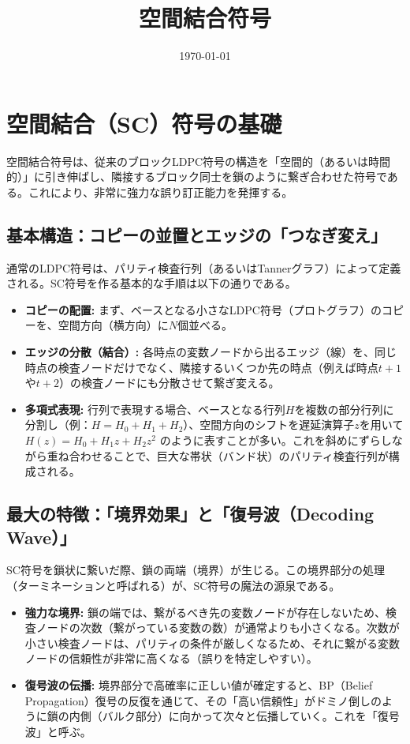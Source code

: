 \documentclass[a4paper,11pt,dvipdfmx]{jsarticle}
\theoremstyle{definition}
\begin{document}
\title{空間結合符号}
\author{}
\date{\today}
\maketitle
\tableofcontents

\section{空間結合（SC）符号の基礎}

空間結合符号は、従来のブロックLDPC符号の構造を「空間的（あるいは時間的）」に引き伸ばし、隣接するブロック同士を鎖のように繋ぎ合わせた符号である。これにより、非常に強力な誤り訂正能力を発揮する。

\subsection{基本構造：コピーの並置とエッジの「つなぎ変え」}
通常のLDPC符号は、パリティ検査行列（あるいはTannerグラフ）によって定義される。SC符号を作る基本的な手順は以下の通りである。

\begin{itemize}
    \item \textbf{コピーの配置:} まず、ベースとなる小さなLDPC符号（プロトグラフ）のコピーを、空間方向（横方向）に$N$個並べる。
    \item \textbf{エッジの分散（結合）:} 各時点の変数ノードから出るエッジ（線）を、同じ時点の検査ノードだけでなく、隣接するいくつか先の時点（例えば時点$t+1$や$t+2$）の検査ノードにも分散させて繋ぎ変える。
    \item \textbf{多項式表現:} 行列で表現する場合、ベースとなる行列$H$を複数の部分行列に分割し（例：$H = H_0 + H_1 + H_2$）、空間方向のシフトを遅延演算子$z$を用いて $H(z) = H_0 + H_1 z + H_2 z^2$ のように表すことが多い。これを斜めにずらしながら重ね合わせることで、巨大な帯状（バンド状）のパリティ検査行列が構成される。
\end{itemize}

\subsection{最大の特徴：「境界効果」と「復号波（Decoding Wave）」}
SC符号を鎖状に繋いだ際、鎖の両端（境界）が生じる。この境界部分の処理（ターミネーションと呼ばれる）が、SC符号の魔法の源泉である。

\begin{itemize}
    \item \textbf{強力な境界:} 鎖の端では、繋がるべき先の変数ノードが存在しないため、検査ノードの次数（繋がっている変数の数）が通常よりも小さくなる。次数が小さい検査ノードは、パリティの条件が厳しくなるため、それに繋がる変数ノードの信頼性が非常に高くなる（誤りを特定しやすい）。
    \item \textbf{復号波の伝播:} 境界部分で高確率に正しい値が確定すると、BP（Belief Propagation）復号の反復を通じて、その「高い信頼性」がドミノ倒しのように鎖の内側（バルク部分）に向かって次々と伝播していく。これを「復号波」と呼ぶ。
\end{itemize}
\end{document}
